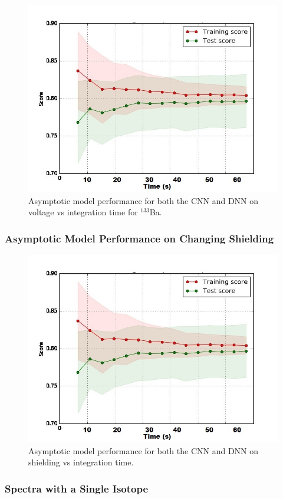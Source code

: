 \begin{figure}[H]
	\centering
	\includegraphics[width=0.75\linewidth]{model_choice_hyperparameter_search_images/asymptotic_performance_time}
	\caption{Asymptotic model performance for both the CNN and DNN on voltage vs integration time for $^{133}$Ba.}
	\label{fig:model_asymptotic_performance_ba133}
\end{figure}

\subsubsection{Asymptotic Model Performance on Changing Shielding}

\begin{figure}[H]
	\centering
	\includegraphics[width=0.75\linewidth]{model_choice_hyperparameter_search_images/asymptotic_performance_time}
	\caption{Asymptotic model performance for both the CNN and DNN on shielding vs integration time.}
	\label{fig:asymptotic_performance}
\end{figure}



\subsubsection{Spectra with a Single Isotope}




